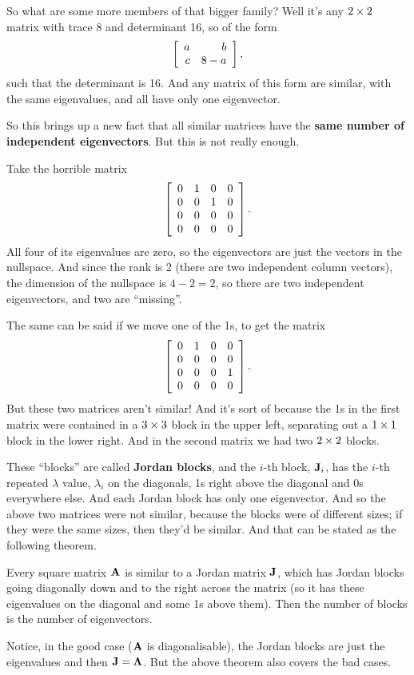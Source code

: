 So what are some more members of that bigger family? Well it's any $2 \times 2$ matrix with trace 8 and determinant 16, so of the form
\[ \left[ \begin{array}{rrrrrrrrrrrrrrrrrrrrrrrrr} a&b\\c&8-a\\ \end{array} \right], \]
such that the determinant is 16. And any matrix of this form are similar, with the same eigenvalues, and all have only one eigenvector.
\eex

So this brings up a new fact that all similar matrices have the \textbf{same number of independent eigenvectors}. But this is not really enough. 

\bex
Take the horrible matrix
\[ \left[ \begin{array}{rrrrrrrrrrrrrrrrrrrrrrrrr} 0&1&0&0\\0&0&1&0\\0&0&0&0\\0&0&0&0\\ \end{array} \right]. \]
All four of its eigenvalues are zero, so the eigenvectors are just the vectors in the nullspace. And since the rank is 2 (there are two independent column vectors), the dimension of the nullspace is $4 - 2 = 2$, so there are two independent eigenvectors, and two are ``missing''.

The same can be said if we move one of the 1s, to get the matrix 
\[ \left[ \begin{array}{rrrrrrrrrrrrrrrrrrrrrrrrr} 0&1&0&0\\0&0&0&0\\0&0&0&1\\0&0&0&0\\ \end{array} \right]. \]
But these two matrices aren't similar! And it's sort of because the 1s in the first matrix were contained in a $3\times 3$ block in the upper left, separating out a $1\times 1$ block in the lower right. And in the second matrix we had two $2 \times 2$ blocks.
\eex

These ``blocks'' are called \textbf{Jordan blocks}, and the $i$-th block, $\boldsymbol{\mathbf{J}}_i$, has the $i$-th repeated $\lambda$ value, $\lambda_i$ on the diagonals, 1s right above the diagonal and 0s everywhere else. And each Jordan block has only one eigenvector. And so the above two matrices were not similar, because the blocks were of different sizes; if they were the same sizes, then they'd be similar. And that can be stated as the following theorem.

\btm
Every square matrix $\boldsymbol{\mathbf{A}}$ is similar to a Jordan matrix $\boldsymbol{\mathbf{J}}$, which has Jordan blocks going diagonally down and to the right across the matrix (so it has these eigenvalues on the diagonal and some 1s above them). Then the number of blocks is the number of eigenvectors.
\etm

Notice, in the good case ($\boldsymbol{\mathbf{A}}$ is diagonalisable), the Jordan blocks are just the eigenvalues and then $\boldsymbol{\mathbf{J}} = \boldsymbol{\mathbf{\Lambda}}$. But the above theorem also covers the bad cases.



